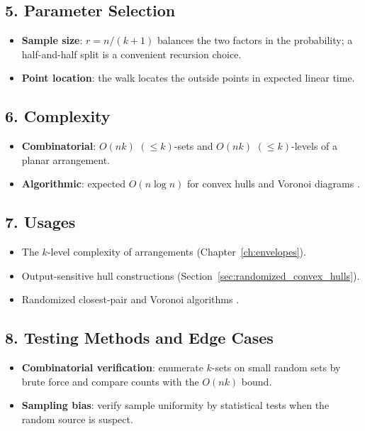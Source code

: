 \subsection{5. Parameter Selection}

\begin{itemize}
\item \textbf{Sample size}: $r = n/(k+1)$ balances the two factors in the
  probability; a half-and-half split is a convenient recursion choice.
\item \textbf{Point location}: the walk locates the outside points in expected
  linear time.
\end{itemize}

\subsection{6. Complexity}

\begin{itemize}
\item \textbf{Combinatorial}: $O(nk)$ $(\le k)$-sets and $O(nk)$ $(\le
  k)$-levels of a planar arrangement.
\item \textbf{Algorithmic}: expected $O(n \log n)$ for convex hulls and Voronoi
  diagrams \cite{clarkson1989,clarkson1993}.
\end{itemize}

\subsection{7. Usages}

\begin{itemize}
\item The $k$-level complexity of arrangements (Chapter~\ref{ch:envelopes}).
\item Output-sensitive hull constructions
  (Section~\ref{sec:randomized_convex_hulls}).
\item Randomized closest-pair and Voronoi algorithms \cite{clarkson1993}.
\end{itemize}

\subsection{8. Testing Methods and Edge Cases}

\begin{itemize}
\item \textbf{Combinatorial verification}: enumerate $k$-sets on small random
  sets by brute force and compare counts with the $O(nk)$ bound.
\item \textbf{Sampling bias}: verify sample uniformity by statistical tests
  when the random source is suspect.
\end{itemize}

